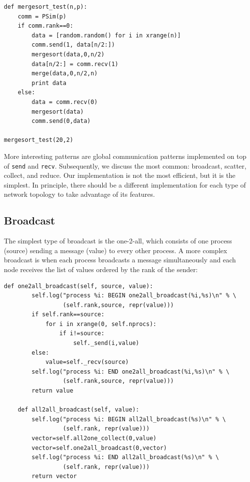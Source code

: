 \documentclass[justified,sixbynine]{tufte-book}
\def\ft{\small\tt}
\theoremstyle{plain}%
\theoremstyle{definition}
\theoremstyle{remark}
\begin{document}
\begin{fullwidth}
\begin{lstlisting}[caption={in file: {\ft psim\_mergesort.py}}]
def mergesort_test(n,p):
    comm = PSim(p)
    if comm.rank==0:
        data = [random.random() for i in xrange(n)]
        comm.send(1, data[n/2:])
        mergesort(data,0,n/2)
        data[n/2:] = comm.recv(1)
        merge(data,0,n/2,n)
        print data
    else:
        data = comm.recv(0)
        mergesort(data)
        comm.send(0,data)

mergesort_test(20,2)
\end{lstlisting}

More interesting patterns are global communication patterns implemented on top of {\ft send} and {\ft recv}. Subsequently, we discuss the most common: broadcast, scatter, collect, and reduce. Our implementation is not the most efficient, but it is the simplest. In principle, there should be a different implementation for each type of network topology to take advantage of its features.


\goodbreak\subsection{Broadcast}

The simplest type of broadcast is the one-2-all, which consists of one process (source) sending a message (value) to every other process. A more complex broadcast is when each process broadcasts a message simultaneously and each node receives the list of values ordered by the rank of the sender:

\begin{lstlisting}[caption={in file: {\ft psim.py}}]
    def one2all_broadcast(self, source, value):
        self.log("process %i: BEGIN one2all_broadcast(%i,%s)\n" % \
                 (self.rank,source, repr(value)))
        if self.rank==source:
            for i in xrange(0, self.nprocs):
                if i!=source:
                    self._send(i,value)
        else:
            value=self._recv(source)
        self.log("process %i: END one2all_broadcast(%i,%s)\n" % \
                 (self.rank,source, repr(value)))
        return value

    def all2all_broadcast(self, value):
        self.log("process %i: BEGIN all2all_broadcast(%s)\n" % \
                 (self.rank, repr(value)))
        vector=self.all2one_collect(0,value)
        vector=self.one2all_broadcast(0,vector)
        self.log("process %i: END all2all_broadcast(%s)\n" % \
                 (self.rank, repr(value)))
        return vector
\end{lstlisting}


\end{fullwidth}
\end{document}
